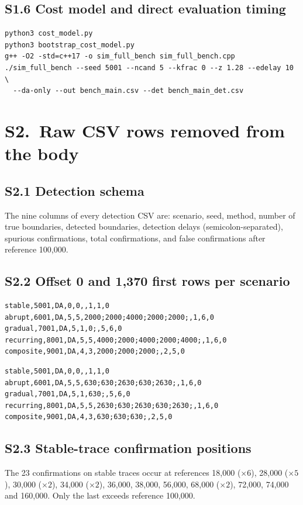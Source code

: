 \documentclass[journal,onecolumn]{IEEEtran}
\begin{document}
\subsection{S1.6 Cost model and direct evaluation timing}
\begin{verbatim}
python3 cost_model.py
python3 bootstrap_cost_model.py
g++ -O2 -std=c++17 -o sim_full_bench sim_full_bench.cpp
./sim_full_bench --seed 5001 --ncand 5 --kfrac 0 --z 1.28 --edelay 10 \
  --da-only --out bench_main.csv --det bench_main_det.csv
\end{verbatim}

\section{S2.\ Raw CSV rows removed from the body}

\subsection{S2.1 Detection schema}
The nine columns of every detection CSV are: scenario, seed, method, number of
true boundaries, detected boundaries, detection delays (semicolon-separated),
spurious confirmations, total confirmations, and false confirmations after
reference 100,000.

\subsection{S2.2 Offset 0 and 1{,}370 first rows per scenario}
\begin{verbatim}
stable,5001,DA,0,0,,1,1,0
abrupt,6001,DA,5,5,2000;2000;4000;2000;2000;,1,6,0
gradual,7001,DA,5,1,0;,5,6,0
recurring,8001,DA,5,5,4000;2000;4000;2000;4000;,1,6,0
composite,9001,DA,4,3,2000;2000;2000;,2,5,0
\end{verbatim}
\begin{verbatim}
stable,5001,DA,0,0,,1,1,0
abrupt,6001,DA,5,5,630;630;2630;630;2630;,1,6,0
gradual,7001,DA,5,1,630;,5,6,0
recurring,8001,DA,5,5,2630;630;2630;630;2630;,1,6,0
composite,9001,DA,4,3,630;630;630;,2,5,0
\end{verbatim}

\subsection{S2.3 Stable-trace confirmation positions}
The 23 confirmations on stable traces occur at references
18{,}000 ($\times 6$), 28{,}000 ($\times 5$), 30{,}000 ($\times 2$),
34{,}000 ($\times 2$), 36{,}000, 38{,}000, 56{,}000, 68{,}000 ($\times 2$),
72{,}000, 74{,}000 and 160{,}000. Only the last exceeds reference 100{,}000.
\end{document}
